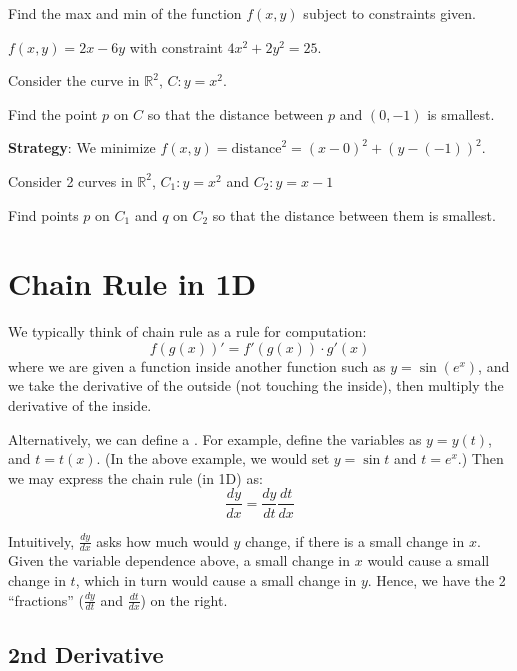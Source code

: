\documentclass[11pt,fleqn]{book} %
\begin{document}
\begin{exercise}
    Find the max and min of the function $f(x, y)$ subject to constraints given.

    $f(x,y) = 2x - 6y$ with constraint $4x^2 + 2y^2 = 25$. 
\end{exercise}

\begin{exercise}
    Consider the curve in $\mathbb{R}^2$, $C: y = x^2$. 

    Find the point $p$ on $C$ so that the distance between $p$ and $(0, -1)$ is smallest.

    \textbf{Strategy}: We minimize $f(x, y) = \text{distance}^2 = (x - 0)^2 + (y -(-1))^2$.
\end{exercise}

\begin{exercise}
    Consider 2 curves in $\mathbb{R}^2$, $C_1: y = x^2$ and $C_2: y = x - 1$

    Find points $p$ on $C_1$ and $q$ on $C_2$ so that the distance between them is smallest.
\end{exercise}

\section{Chain Rule in 1D}

We typically think of chain rule as a rule for computation: $$f(g(x))' = f'(g(x)) \cdot g'(x)$$ where we are given a function inside another function such as $y = \sin(e^x)$, and we take the derivative of the outside (not touching the inside), then multiply the derivative of the inside.

Alternatively, we can define a . For example, define the variables as $y = y(t)$, and $t = t(x)$. (In the above example, we would set $y = \sin t$ and $t = e^x$.) Then we may express the chain rule (in 1D) as: $$\frac{dy}{dx} = \frac{dy}{dt} \frac{dt}{dx}$$

Intuitively, $\frac{dy}{dx}$ asks how much would $y$ change, if there is a small change in $x$. Given the variable dependence above, a small change in $x$ would cause a small change in $t$, which in turn would cause a small change in $y$. Hence, we have the 2 ``fractions'' ($\frac{dy}{dt}$ and $\frac{dt}{dx}$) on the right.

\subsection*{2nd Derivative}
\end{document}
